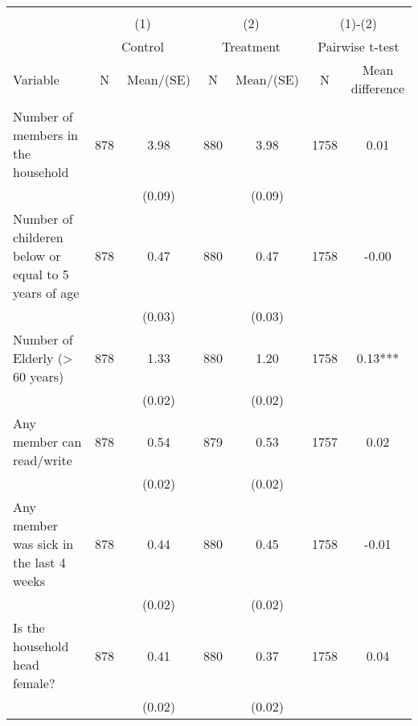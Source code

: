 
\begin{tabular}{@{\extracolsep{5pt}}lcccccc}
\\[-1.8ex]\hline \hline \\[-1.8ex]
 & \multicolumn{2}{c}{(1)}  & \multicolumn{2}{c}{(2)}  & \multicolumn{2}{c}{(1)-(2)} \\
 & \multicolumn{2}{c}{Control}  & \multicolumn{2}{c}{Treatment}  & \multicolumn{2}{c}{Pairwise t-test}  \\
Variable & N & Mean/(SE) & N & Mean/(SE) & N & Mean difference \\ \hline \\[-1.8ex] 
Number of members in the household   & 878    & 3.98    & 880    & 3.98    & 1758    & 0.01   \\
 &   & (0.09)  &   & (0.09)  &   &  \\ [1ex]
Number of childeren below or equal to 5 years of age   & 878    & 0.47    & 880    & 0.47    & 1758    & -0.00   \\
 &   & (0.03)  &   & (0.03)  &   &  \\ [1ex]
Number of Elderly (> 60 years)   & 878    & 1.33    & 880    & 1.20    & 1758    & 0.13***   \\
 &   & (0.02)  &   & (0.02)  &   &  \\ [1ex]
Any member can read/write   & 878    & 0.54    & 879    & 0.53    & 1757    & 0.02   \\
 &   & (0.02)  &   & (0.02)  &   &  \\ [1ex]
Any member was sick in the last 4 weeks   & 878    & 0.44    & 880    & 0.45    & 1758    & -0.01   \\
 &   & (0.02)  &   & (0.02)  &   &  \\ [1ex]
Is the household head female?   & 878    & 0.41    & 880    & 0.37    & 1758    & 0.04   \\
 &   & (0.02)  &   & (0.02)  &   &  \\ [1ex]

\end{tabular}
